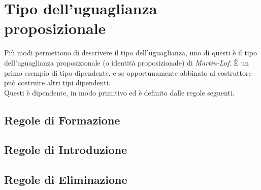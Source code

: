 \chapter{Tipo dell'uguaglianza proposizionale}
\label{cap: uguaglianza-proposizionale}
Pi\`u modi permettono di descrivere il tipo dell'uguaglianza, uno di questi \`e il tipo dell'uguaglianza proposizionale (o identit\`a proposizionale) di \textit{Martin-L$\ddot{o}$f}. \`E un primo esempio di tipo dipendente, e se opportunamente abbinato al costruttore pu\`o costruire altri tipi dipendenti.\\
\noindent
Questi \`e dipendente, in modo primitivo ed \`e definito dalle regole seguenti.

\section{Regole di Formazione}
\label{subsec: formazione-id}
\begin{prooftree}
\end{prooftree}

\section{Regole di Introduzione}
\label{subsec: introduzione-id}
\begin{prooftree}
\end{prooftree}

\section{Regole di Eliminazione}
\label{subsec: eliminazione-id}
\small
\begin{prooftree}
\end{prooftree}

